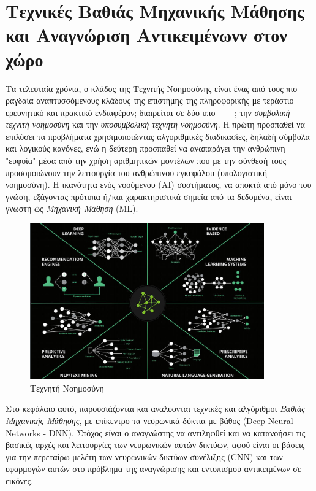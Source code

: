 \chapter{Τεχνικές Βαθιάς Μηχανικής Μάθησης και Αναγνώριση Αντικειμένωνν στον χώρο}
\label{chapter:theory}


Τα τελευταία χρόνια, ο κλάδος της Τεχνιτής Νοημοσύνης είναι ένας από τους πιο ραγδαία
αναπτυσσόμενους κλάδους της επιστήμης της πληροφορικής με τεράστιο
ερευνητικό και πρακτικό ενδιαφέρον; διαιρείται σε δύο υπο\_\_\_; την \emph{συμβολική τεχνιτή
νοημοσύνη} και την \emph{υποσυμβολική τεχνητή νοημοσύνη}. Η πρώτη προσπαθεί να
επιλύσει τα προβλήματα χρησιμοποιώντας αλγοριθμικές διαδικασίες, δηλαδή
σύμβολα και λογικούς κανόνες, ενώ η δεύτερη προσπαθεί να αναπαράγει την
ανθρώπινη "ευφυία" μέσα από την χρήση αριθμητικών μοντέλων
που με την σύνθεσή τους προσομοιώνουν την λειτουργία του ανθρώπινου εγκεφάλου
(υπολογιστική νοημοσύνη).
Η ικανότητα ενός νοούμενου (AI) συστήματος, να αποκτά από μόνο του γνώση,
εξάγοντας πρότυπα ή/και χαρακτηριστικά σημεία από τα δεδομένα,
είναι γνωστή ώς \emph{Μηχανική Μάθηση} (ML).
\begin{figure}[H]
  \centering
  \includegraphics[width=0.9\textwidth]{./images/chapter3/AI_1.jpg}
  \caption[Τεχνητή Νοημοσύνη]{Τεχνητή Νοημοσύνη}
  \label{fig:AI_1}
\end{figure}

Στο κεφάλαιο αυτό, παρουσιάζονται και αναλύονται τεχνικές και αλγόριθμοι
\emph{Βαθιάς Μηχανικής Μάθησης}, με επίκεντρο τα νευρωνικά δύκτια με βάθος (Deep Neural Networks - DNN).
Στόχος είναι ο αναγνώστης να αντιληφθεί και να κατανοήσει τις βασικές αρχές και
λειτουργίες των νευρωνικών αυτών δικτύων, αφού είναι οι βάσεις για την περεταίρω
μελέτη των νευρωνικών δικτύων συνέλιξης (CNN) και των εφαρμογών αυτών στο
πρόβλημα της αναγνώρισης και εντοπισμού αντικειμένων σε εικόνες.





